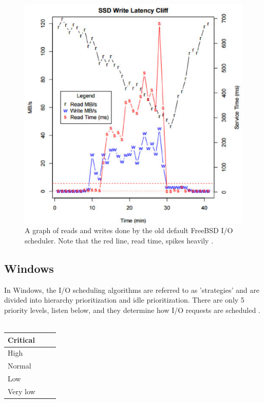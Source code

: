 \documentclass[10pt,draftclsnofoot,onecolumn,journal,compsoc]{IEEEtran}
\begin{document}
\begin{figure}[H]
\centering
    \includegraphics[scale=.6]{graph.eps}
    \caption{A graph of reads and writes done by the old default FreeBSD I/O scheduler. Note that the red line, read time, spikes heavily \cite{bsd2}.}
\end{figure}

\subsection{Windows}
In Windows, the I/O scheduling algorithms are referred to as 'strategies' and are divided into hierarchy prioritization and idle prioritization. There are only 5 priority levels, listen below, and they determine how I/O requests are scheduled \cite{win_shd}. \\ \\
\begin{tabular}{ | p{0.2\linewidth} |}
    \hline
    Critical\\ \hline
    High \\ \hline
    Normal \\ \hline
    Low \\ \hline
    Very low \\ \hline
\end{tabular} \\ \\ 
\end{document}
